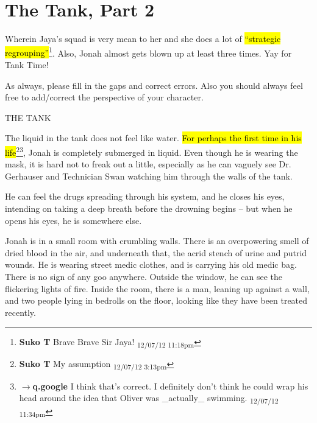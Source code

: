 \setcounter{chapter}{ 11 }
\chapter{\textbf{The Tank, Part 2} }



\subChapterTitle{}





Wherein Jaya's squad is very mean to her and she does a lot of \hl{``strategic regrouping''}\footnote{\textbf{Suko T }Brave Brave Sir Jaya! \textsubscript{12/07/12 11:18pm}}.  Also, Jonah almost gets blown up at least three times.  Yay for Tank Time!



As always, please fill in the gaps and correct errors.  Also you should always feel free to add/correct the perspective of your character.



\noindent\hrulefill





 {\LARGE THE TANK } 



The liquid in the tank does not feel like water. \hl{For perhaps the first time in his life}\footnote{\textbf{Suko T }My assumption \textsubscript{12/07/12 3:13pm}}\footnote{$\rightarrow$\textbf{q.google }I think that's correct.  I definitely don't think he could wrap his head around the idea that Oliver was \_actually\_ swimming. \textsubscript{12/07/12 11:34pm}}, Jonah is completely submerged in liquid.  Even though he is wearing the mask, it is hard not to freak out a little, especially as he can vaguely see Dr. Gerhauser and Technician Swan watching him through the walls of the tank.  



He can feel the drugs spreading through his system, and he closes his eyes, intending on taking a deep breath before the drowning begins -- but when he opens his eyes, he is somewhere else.  



Jonah is in a small room with crumbling walls.  There is an overpowering smell of dried blood in the air, and underneath that, the acrid stench of urine and putrid wounds.  He is wearing street medic clothes, and is carrying his old medic bag.  There is no sign of any goo anywhere.  Outside the window, he can see the flickering lights of fire.  Inside the room, there is a man, leaning up against a wall, and two people lying in bedrolls on the floor, looking like they have been treated recently.



